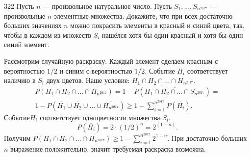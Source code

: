 \begin{task}{322}
Пусть 
$n$ — произвольное натуральное число. Пусть $S_1, \dots, S_{n^{2017}}$ — произвольные $n$‑элементные множества. Докажите, что при всех достаточно больших значениях $n$ можно покрасить элементы в красный и синий цвета, так, чтобы в каждом из множеств $S_i$ нашёлся хотя бы один красный и хотя бы один синий элемент.
\end{task}

\begin{solution}
Рассмотрим случайную раскраску. Каждый элемент сделаем красным с вероятностью $1/2$ и синим с вероятностью $1/2$. Событие $H_i$ соответствует наличию в $S_i$ двух цветов. Наше условие: $H_1 \cap H_2 \cap \dots \cap H_{n^{2017}}$.
\begin{multline*}
P(H_1 \cap H_2 \cap \dots \cap H_{n^{2017}}) = 1 - P(\overline{H_1 \cap H_2 \cap \dots \cap S_{n^{2017}}}) =\\ 1 - P(\overline{H_1} \cup \overline{H_2} \cup \dots \cup \overline{H_{n^{2017}}}) \geq 1 - \sum\limits_{i=1}^{{n}^{2017}} P(\overline{H_i}).
\end{multline*}
$Событие \overline{H_i}$ соответствует одноцветности множества $S_i$. 
\[P(\overline{H_i}) = 2\cdot(1/2)^n = 2^{(1-n)}.\]
Получим $P(H_1 \cap H_2 \cap \dots \cap H_{n^{2017}}) \geq 1 - \sum\limits_{i=1}^{{n}^{2017}} 2^{1-n}$. При достаточно больших $n$ выражение положительно, значит требуемая раскраска возможна.\end{solution}